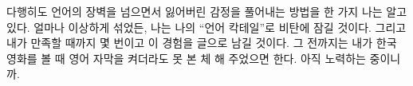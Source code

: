 \documentclass{translation}
\begin{document}
다행히도 언어의 장벽을 넘으면서 잃어버린 감정을 풀어내는 방법을 한 가지 나는 알고 있다.
얼마나 이상하게 섞었든, 나는 나의 ``언어 칵테일''로 비탄에 잠길 것이다.
그리고 내가 만족할 때까지 몇 번이고 이 경험을 글으로 남길 것이다.
그 전까지는 내가 한국 영화를 볼 때 영어 자막을 켜더라도 못 본 체 해 주었으면 한다.
아직 노력하는 중이니까.
\end{document}
